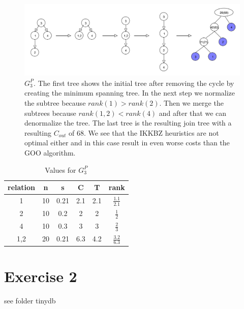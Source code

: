 \documentclass[11pt,a4paper]{scrartcl}
\begin{document}
\begin{figure}[H]
	\begin{center}
		\includegraphics[width=\textwidth]{graphs/gp3}
	\end{center}
	\caption{$G^P_3$. The first tree shows the initial tree after removing the cycle by creating the minimum spanning tree. In the next step we normalize the subtree because $rank(1)>rank(2)$. Then we merge the subtrees because $rank(1,2)<rank(4)$ and after that we can denormalize the tree. The last tree is the resulting join tree with a resulting $C_{out}$ of 68. We see that the IKKBZ heuristics are not optimal either and in this case result in even worse costs than the GOO algorithm.}
	\label{fig:gp3}
\end{figure}

\begin{table}[H]
  \caption{Values for $G^P_3$}
  \begin{center}
 \begin{tabular}{c|c|c|c|c|c}
  relation & n & s & C & T & rank\\
  \hline 
  1 & 10 & 0.21 & 2.1 & 2.1 & $\frac{1.1}{2.1}$ \\
  2 & 10 & 0.2 & 2 & 2 & $\frac{1}{2}$ \\
  4 & 10 & 0.3 & 3 & 3 & $\frac{2}{3}$ \\
  1,2 & 20 & 0.21 & 6.3 & 4.2 & $\frac{3.2}{6.3}$ \\
 \end{tabular}  
  \end{center}
 \label{tab:gp1}
\end{table}

\section*{Exercise 2}

see folder tinydb
\end{document}
